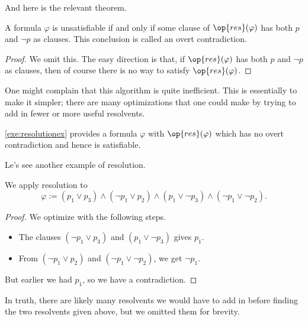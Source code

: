 And here is the relevant theorem.
\begin{theorem}
	A formula $\varphi$ is unsatisfiable if and only if some clause of $\op{res}(\varphi)$ has both $p$ and $\lnot p$ as clauses. This conclusion is called an overt contradiction.
\end{theorem}
\begin{proof}
	We omit this. The easy direction is that, if $\op{res}(\varphi)$ has both $p$ and $\lnot p$ as clauses, then of course there is no way to satisfy $\op{res}(\varphi)$.
\end{proof}
\begin{remark}
	One might complain that this algorithm is quite inefficient. This is essentially to make it simpler; there are many optimizations that one could make by trying to add in fewer or more useful resolvents.
\end{remark}
\begin{example}
	\autoref{exe:resolutionex} provides a formula $\varphi$ with $\op{res}(\varphi)$ which has no overt contradiction and hence is satisfiable.
\end{example}
Le's see another example of resolution.
\begin{exe}
	We apply resolution to
	\[\varphi:=(p_1\lor p_3)\land(\lnot p_1\lor p_2)\land(p_1\lor\lnot p_3)\land(\lnot p_1\lor\lnot p_2).\]
\end{exe}
\begin{proof}
	We optimize with the following steps.
	\begin{itemize}
		\item The clauses $(\lnot p_1\lor p_3)$ and $(p_1\lor\lnot p_3)$ gives $p_1$.
		\item From $(\lnot p_1\lor p_2)$ and $(\lnot p_1\lor\lnot p_2)$, we get $\lnot p_1$.
	\end{itemize}
	But earlier we had $p_1$, so we have a contradiction.
\end{proof}
In truth, there are likely many resolvents we would have to add in before finding the two resolvents given above, but we omitted them for brevity.

